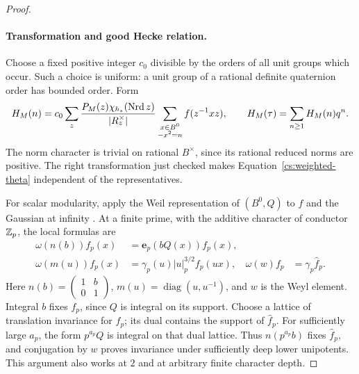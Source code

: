 \begin{proof}
\paragraph{Transformation and good Hecke relation.}
Choose a fixed positive integer $c_0$ divisible by the orders of all
unit groups which occur.  Such a choice is uniform: a unit group of a
rational definite quaternion order has bounded order.  Form
\begin{equation}
 H_M(n)=c_0\sum_z\frac{P_M(z)\chi_{h_*}(\operatorname{Nrd} z)}{|R_z^\times|}
             \sum_{\substack{x\in B^0\\-x^2=n}}f(z^{-1}xz),
 \qquad H_M(\tau)=\sum_{n\geq1}H_M(n)q^n.
\label{cs:weighted-theta}
\end{equation}
The norm character is trivial on rational $B^\times$, since its rational
reduced norms are positive.  The right transformation just checked makes
Equation~\eqref{cs:weighted-theta} independent of the representatives.

For scalar modularity, apply the Weil representation of $(B^0,Q)$
to $f$ and the Gaussian at infinity \citep{Weil1964}.  At a finite prime,
with the additive character of conductor $\mathbb Z_p$, the local formulas are
\citep[Section~4.3, pp.~1965--1966]{PalDeVeraPiquero2019}
\[
 \begin{aligned}
 \omega(n(b))f_p(x)&=\mathbf e_p(bQ(x))f_p(x),\\
 \omega(m(u))f_p(x)&=\gamma_p(u)|u|_p^{3/2}f_p(ux),
 &\omega(w)f_p&=\gamma_p\widehat f_p.
 \end{aligned}
\]
Here $n(b)=\left(\begin{smallmatrix}1&b\\0&1\end{smallmatrix}\right)$,
$m(u)=\operatorname{diag}(u,u^{-1})$, and $w$ is the Weyl element.
Integral $b$ fixes $f_p$, since $Q$ is integral on its support.
Choose a lattice of translation invariance for $f_p$; its dual contains
the support of $\widehat f_p$. For sufficiently large $a_p$, the form
$p^{a_p}Q$ is integral on that dual lattice. Thus
$n(p^{a_p}b)$ fixes $\widehat f_p$, and conjugation by $w$ proves
invariance under sufficiently deep lower unipotents. This argument
also works at $2$ and at arbitrary finite character depth.


\end{proof}
